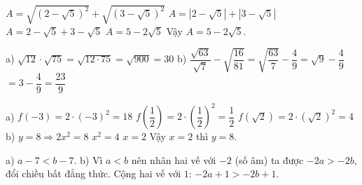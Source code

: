 \begin{problem}[9DS-CAN-002]
$A = \sqrt{(2 - \sqrt{5})^2} + \sqrt{(3 - \sqrt{5})^2}$
$A = |2 - \sqrt{5}| + |3 - \sqrt{5}|$
$A = 2 - \sqrt{5} + 3 - \sqrt{5}$
$A = 5 - 2\sqrt{5}$
Vậy $A = 5 - 2\sqrt{5}$.
\end{problem}

\begin{problem}[9DS-CAN-003]
a) $\sqrt{12} \cdot \sqrt{75} = \sqrt{12 \cdot 75} = \sqrt{900} = 30$
b) $\dfrac{\sqrt{63}}{\sqrt{7}} - \sqrt{\dfrac{16}{81}} = \sqrt{\dfrac{63}{7}} - \dfrac{4}{9} = \sqrt{9} - \dfrac{4}{9}$
$= 3 - \dfrac{4}{9} = \dfrac{23}{9}$
\end{problem}

\begin{problem}[9DS-HSB2-001]
a) $f(-3) = 2 \cdot (-3)^2 = 18$
$f\left(\dfrac{1}{2}\right) = 2 \cdot \left(\dfrac{1}{2}\right)^2 = \dfrac{1}{2}$
$f\left(\sqrt{2}\right) = 2 \cdot \left(\sqrt{2}\right)^2 = 4$
b) $y = 8 \Rightarrow 2x^2 = 8$
$x^2 = 4$
$x = 2$
Vậy $x = 2$ thì $y = 8$.
\end{problem}

\begin{problem}[9DS-BPT-001]
a) $a - 7 < b - 7$.
b) Vì $a < b$ nên nhân hai vế với $-2$ (số âm) ta được $-2a > -2b$, đổi chiều bất đẳng thức.
Cộng hai vế với $1$: $-2a + 1 > -2b + 1$.
\end{problem}
